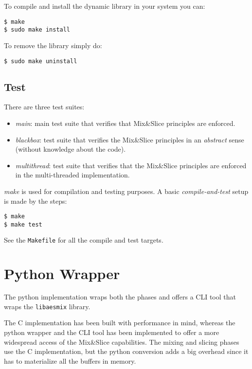 To compile and install the dynamic library in your system you can:

\begin{verbatim}
$ make
$ sudo make install
\end{verbatim}

To remove the library simply do:

\begin{verbatim}
$ sudo make uninstall
\end{verbatim}

\subsection{Test}\label{test}

There are three test suites:

\begin{itemize}
\item
  \emph{main}: main test suite that verifies that Mix\&Slice principles
  are enforced.
\item
  \emph{blackbox}: test suite that verifies the Mix\&Slice principles in
  an \emph{abstract} sense (without knowledge about the code).
\item
  \emph{multithread}: test suite that verifies that the Mix\&Slice
  principles are enforced in the multi-threaded implementation.
\end{itemize}

\emph{make} is used for compilation and testing purposes. A basic
\emph{compile-and-test} setup is made by the steps:

\begin{verbatim}
$ make
$ make test
\end{verbatim}

See the \texttt{Makefile} for all the compile and test targets.


\section{Python Wrapper}\label{aesmix-python}

The python implementation
wraps both the phases and offers a CLI tool that wraps the
\texttt{libaesmix} library.

The C implementation has been built with performance in mind, whereas
the python wrapper and the CLI tool has been implemented to offer a more
widespread access of the Mix\&Slice capabilities. The mixing and slicing
phases use the C implementation, but the python conversion adds a big
overhead since it has to materialize all the buffers in memory.


